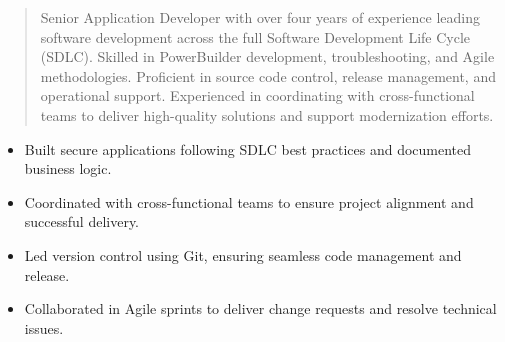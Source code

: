 



\makecvheader

\begin{quote}
  \noindent
  Senior Application Developer with over four years of experience leading software development across the full Software Development Life Cycle (SDLC). Skilled in PowerBuilder development, troubleshooting, and Agile methodologies. Proficient in source code control, release management, and operational support. Experienced in coordinating with cross-functional teams to deliver high-quality solutions and support modernization efforts.
\end{quote}

\par\smallskip
\noindent
\begin{minipage}{20cm}
  \begin{minipage}{9.75cm}
    \begin{itemize}
      \item Built secure applications following SDLC best practices and documented business logic.
      \item Coordinated with cross-functional teams to ensure project alignment and successful delivery.
    \end{itemize}
  \end{minipage}
  \hfill
  \begin{minipage}{9.75cm}
    \begin{itemize}
      \item Led version control using Git, ensuring seamless code management and release.
      \item Collaborated in Agile sprints to deliver change requests and resolve technical issues.
    \end{itemize}
  \end{minipage}
\end{minipage}
\par\smallskip
\divider

